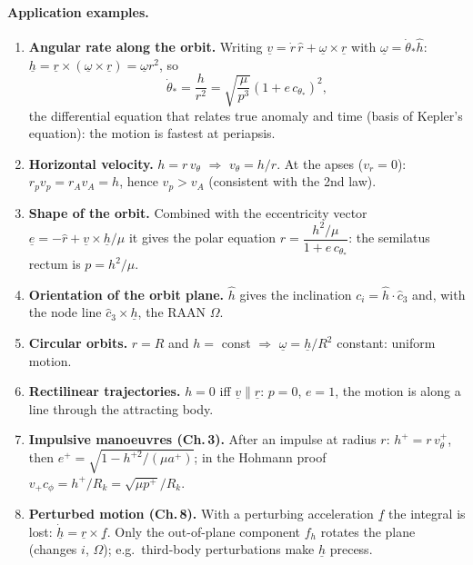 \paragraph{Application examples.}
\begin{enumerate}[label=(\arabic*)]
\item \textbf{Angular rate along the orbit.} Writing $\underline v=\dot r\,\hat r+\underline\omega\times\underline r$ with
$\underline\omega=\dot\theta_*\hat h$: $\underline h=\underline r\times(\underline\omega\times\underline r)=\underline\omega r^2$, so
\begin{equation}
\dot\theta_*=\frac{h}{r^2}=\sqrt{\frac{\mu}{p^3}}\left(1+e\,c_{\theta_*}\right)^2 ,
\end{equation}
the differential equation that relates true anomaly and time (basis of Kepler's equation): the motion is fastest at periapsis.
\item \textbf{Horizontal velocity.} $h=r\,v_\theta$ $\Rightarrow$ $v_\theta=h/r$. At the apses ($v_r=0$):
$r_p v_p=r_A v_A=h$, hence $v_p>v_A$ (consistent with the 2nd law).
\item \textbf{Shape of the orbit.} Combined with the eccentricity vector $\underline e=-\hat r+\underline v\times\underline h/\mu$
it gives the polar equation $r=\dfrac{h^2/\mu}{1+e\,c_{\theta_*}}$: the semilatus rectum is $p=h^2/\mu$.
\item \textbf{Orientation of the orbit plane.} $\hat h$ gives the inclination $c_i=\hat h\cdot\hat c_3$ and, with the node
line $\hat c_3\times\underline h$, the RAAN $\Omega$.
\item \textbf{Circular orbits.} $r=R$ and $h=$ const $\Rightarrow$ $\underline\omega=\underline h/R^2$ constant: uniform motion.
\item \textbf{Rectilinear trajectories.} $h=0$ iff $\underline v\parallel\underline r$: $p=0$, $e=1$, the motion is along a line
through the attracting body.
\item \textbf{Impulsive manoeuvres (Ch.\,3).} After an impulse at radius $r$: $h^+=r\,v_\theta^+$, then
$e^+=\sqrt{1-h^{+2}/(\mu a^+)}$; in the Hohmann proof $v_+c_\phi=h^+/R_k=\sqrt{\mu p^+}/R_k$.
\item \textbf{Perturbed motion (Ch.\,8).} With a perturbing acceleration $\underline f$ the integral is lost:
$\dot{\underline h}=\underline r\times\underline f$. Only the out-of-plane component $f_h$ rotates the plane (changes $i$,
$\Omega$); e.g.\ third-body perturbations make $\underline h$ precess.
\end{enumerate}

